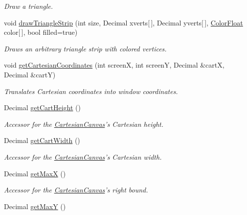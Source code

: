 \begin{DoxyCompactItemize}
\begin{DoxyCompactList}\small\item\em Draw a triangle. \end{DoxyCompactList}\item 
void \hyperlink{classtsgl_1_1_cartesian_canvas_a924f6148489c634ec4d47970e498a26a}{draw\-Triangle\-Strip} (int size, Decimal xverts\mbox{[}$\,$\mbox{]}, Decimal yverts\mbox{[}$\,$\mbox{]}, \hyperlink{structtsgl_1_1_color_float}{Color\-Float} color\mbox{[}$\,$\mbox{]}, bool filled=true)
\begin{DoxyCompactList}\small\item\em Draws an arbitrary triangle strip with colored vertices. \end{DoxyCompactList}\item 
void \hyperlink{classtsgl_1_1_cartesian_canvas_a736935074bb6d90bcc0c7af2edd8a4aa}{get\-Cartesian\-Coordinates} (int screen\-X, int screen\-Y, Decimal \&cart\-X, Decimal \&cart\-Y)
\begin{DoxyCompactList}\small\item\em Translates Cartesian coordinates into window coordinates. \end{DoxyCompactList}\item 
Decimal \hyperlink{classtsgl_1_1_cartesian_canvas_a66657636eaf20ff465898d3f932063ce}{get\-Cart\-Height} ()
\begin{DoxyCompactList}\small\item\em Accessor for the \hyperlink{classtsgl_1_1_cartesian_canvas}{Cartesian\-Canvas}'s Cartesian height. \end{DoxyCompactList}\item 
Decimal \hyperlink{classtsgl_1_1_cartesian_canvas_a829a97323261515097b7589bc96c109c}{get\-Cart\-Width} ()
\begin{DoxyCompactList}\small\item\em Accessor for the \hyperlink{classtsgl_1_1_cartesian_canvas}{Cartesian\-Canvas}'s Cartesian width. \end{DoxyCompactList}\item 
Decimal \hyperlink{classtsgl_1_1_cartesian_canvas_ae3cbac386f78ecff082b8c4cbd9081ed}{get\-Max\-X} ()
\begin{DoxyCompactList}\small\item\em Accessor for the \hyperlink{classtsgl_1_1_cartesian_canvas}{Cartesian\-Canvas}'s right bound. \end{DoxyCompactList}\item 
Decimal \hyperlink{classtsgl_1_1_cartesian_canvas_a68c0616f8180690423d39e9e83045b8c}{get\-Max\-Y} ()

\end{DoxyCompactItemize}
